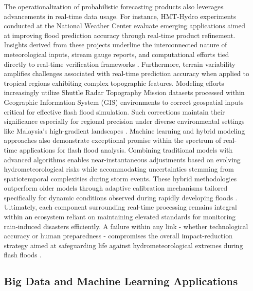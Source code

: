 The operationalization of probabilistic forecasting products also leverages advancements in real-time data usage. For instance, HMT-Hydro experiments conducted at the National Weather Center evaluate emerging applications aimed at improving flood prediction accuracy through real-time product refinement. Insights derived from these projects underline the interconnected nature of meteorological inputs, stream gauge reports, and computational efforts tied directly to real-time verification frameworks \citep{Martinaitis2023}.
Furthermore, terrain variability amplifies challenges associated with real-time prediction accuracy when applied to tropical regions exhibiting complex topographic features. Modeling efforts increasingly utilize Shuttle Radar Topography Mission datasets processed within Geographic Information System (GIS) environments to correct geospatial inputs critical for effective flash flood simulation. Such corrections maintain their significance especially for regional precision under diverse environmental settings like Malaysia's high-gradient landscapes \citep{Maqtan2022a}\citep{Maqtan2022b}.
Machine learning and hybrid modeling approaches also demonstrate exceptional promise within the spectrum of real-time applications for flash flood analysis. Combining traditional models with advanced algorithms enables near-instantaneous adjustments based on evolving hydrometeorological risks while accommodating uncertainties stemming from spatiotemporal complexities during storm events. These hybrid methodologies outperform older models through adaptive calibration mechanisms tailored specifically for dynamic conditions observed during rapidly developing floods \citep{Hinge2024}.
Ultimately, each component surrounding real-time processing remains integral within an ecosystem reliant on maintaining elevated standards for monitoring rain-induced disasters efficiently. A failure within any link - whether technological accuracy or human preparedness - compromises the overall impact-reduction strategy aimed at safeguarding life against hydrometeorological extremes during flash floods \citep{Jubach2016}.
\subsection{Big Data and Machine Learning Applications}
